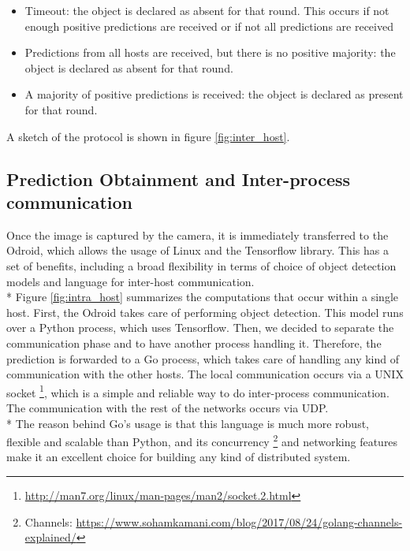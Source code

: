 \documentclass[10pt,conference,compsocconf]{IEEEtran}
\begin{document}
\begin{enumerate}
\begin{itemize}
\item Timeout: the object is declared as absent for that round. This occurs if not enough positive predictions are received or if not all predictions are received
\item Predictions from all hosts are received, but there is no positive majority: the object is declared as absent for that round.
\item A majority of positive predictions is received: the object is declared as present for that round.
\end{itemize}
A sketch of the protocol is shown in figure \ref{fig:inter_host}.
\subsection{Prediction Obtainment and Inter-process communication}Once the image is captured by the camera, it is immediately transferred to the Odroid, which allows the usage of Linux and the Tensorflow library. This has a set of benefits, including a broad flexibility in terms of choice of object detection models and language for inter-host communication.\\*
Figure \ref{fig:intra_host} summarizes the computations that occur within a single host.
First, the Odroid takes care of performing object detection. This model runs over a Python process, which uses Tensorflow. Then, we decided to separate the communication phase and to have another process handling it.
Therefore, the prediction is forwarded to a Go process, which takes care of handling any kind of communication with the other hosts. The local communication occurs via a UNIX socket \footnote{\url{http://man7.org/linux/man-pages/man2/socket.2.html}}, which is a simple and reliable way to do inter-process communication. The communication with the rest of the networks occurs via UDP.\\*
The reason behind Go's usage is that this language is much more robust, flexible and scalable than Python, and its concurrency \footnote{Channels: \url{https://www.sohamkamani.com/blog/2017/08/24/golang-channels-explained/}} and networking features make it an excellent choice for building any kind of distributed system.

\end{enumerate}
\end{document}
